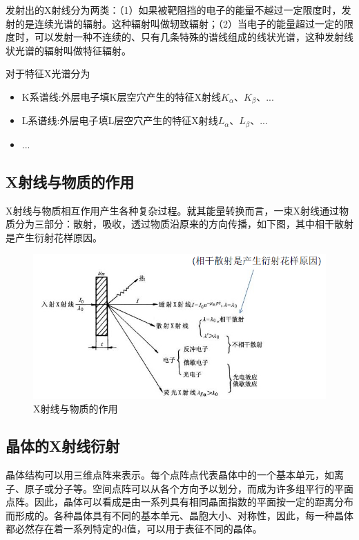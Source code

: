 \documentclass[a4paper]{article}
\begin{document}
发射出的X射线分为两类：（1）如果被靶阻挡的电子的能量不越过一定限度时，发射的是连续光谱的辐射。这种辐射叫做轫致辐射；（2）当电子的能量超过一定的限度时，可以发射一种不连续的、只有几条特殊的谱线组成的线状光谱，这种发射线状光谱的辐射叫做特征辐射。

对于特征X光谱分为
\begin{itemize}
	\item K系谱线:外层电子填K层空穴产生的特征X射线$ K_\alpha $、$ K_\beta $、...
	\item L系谱线:外层电子填L层空穴产生的特征X射线$ L_\alpha $、$ L_\beta $、...
	\item ...
\end{itemize}
\subsection{X射线与物质的作用}
X射线与物质相互作用产生各种复杂过程。就其能量转换而言，一束X射线通过物质分为三部分：散射，吸收，透过物质沿原来的方向传播，如下图，其中相干散射是产生衍射花样原因。
\begin{figure}[H]
	\centering
	\includegraphics[width=0.7\linewidth]{fig/X2.jpg}
	\caption{X射线与物质的作用}
\end{figure}


\subsection{晶体的X射线衍射}
晶体结构可以用三维点阵来表示。每个点阵点代表晶体中的一个基本单元，如离子、原子或分子等。空间点阵可以从各个方向予以划分，而成为许多组平行的平面点阵。因此，晶体可以看成是由一系列具有相同晶面指数的平面按一定的距离分布而形成的。各种晶体具有不同的基本单元、晶胞大小、对称性，因此，每一种晶体都必然存在着一系列特定的d值，可以用于表征不同的晶体。
\end{document}

